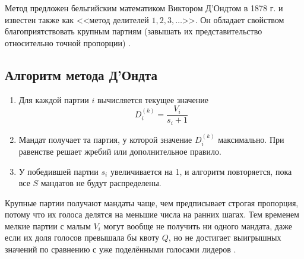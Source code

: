 Метод предложен бельгийским математиком Виктором Д’Ондтом в 1878 г. и известен также как <<метод делителей $1, 2, 3, \ldots$>>. Он обладает свойством благоприятствовать крупным партиям (завышать их представительство относительно точной пропорции) \cite{balfair,gallprop}.
\subsection{Алгоритм метода Д'Ондта}
\begin{enumerate}
    \item Для каждой партии $i$ вычисляется текущее значение
    \begin{equation*}
        D^{(k)}_i = \frac{V_i}{s_i+1}
    \end{equation*}
    \item Мандат получает та партия, у которой значение 
$ D^{(k)}_i$ максимально. При равенстве решает жребий или дополнительное правило.
\item У победившей партии $s_i$ увеличивается на 1, и алгоритм повторяется, пока все $S$ мандатов не будут распределены.
\end{enumerate}

Крупные партии получают мандаты чаще, чем предписывает строгая пропорция, потому что их голоса делятся на меньшие числа на ранних шагах. Тем временем мелкие партии с малым $V_i$ могут вообще не получить ни одного мандата, даже если их доля голосов превышала бы квоту $Q$, но не достигает выигрышных значений по сравнению с уже поделёнными голосами лидеров \cite{puke}.